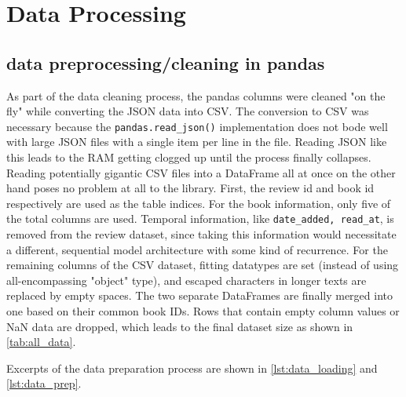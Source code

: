 \documentclass[10pt,final,journal,a4paper,oneside,twocolumn]{IEEEtran}
\begin{document}
\section{Data Processing}\label{sec:data_preprocessing}
\subsection{data preprocessing/cleaning in pandas}
As part of the data cleaning process, the pandas columns were cleaned "on the fly" while converting the JSON data into CSV.
The conversion to CSV was necessary because the \texttt{pandas.read_json()} implementation does not bode well with large JSON files with a single item per line in the file. Reading JSON like this leads to the RAM getting clogged up until the process finally collapses. Reading potentially gigantic CSV files into a DataFrame all at once on the other hand poses no problem at all to the library.
First, the review id and book id respectively are used as the table indices. For the book information, only five of the total  columns are used. Temporal information, like \texttt{date_added, read_at}, is removed from the review dataset, since taking this information would necessitate a different, sequential model architecture with some kind of recurrence.
For the remaining columns of the CSV dataset, fitting datatypes are set (instead of using all-encompassing "object" type), and escaped characters in longer texts are replaced by empty spaces.
The two separate DataFrames are finally merged into one based on their common book IDs. Rows that contain empty column values or NaN data are dropped, which leads to the final dataset size as shown in \autoref{tab:all_data}.

Excerpts of the data preparation process are shown in \autoref{lst:data_loading} and \autoref{lst:data_prep}.
\end{document}
